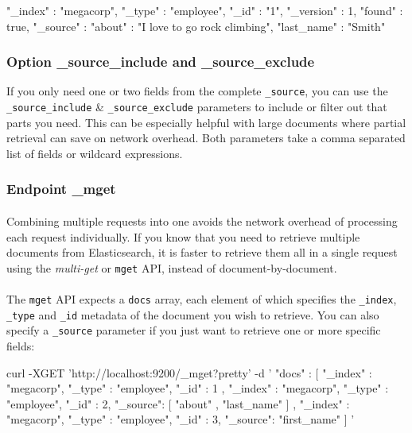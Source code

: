\documentclass{article}%
\begin{document}
\begin{command}
{
	"_index" : "megacorp",
	"_type" : "employee",
	"_id" : "1",
	"_version" : 1,
	"found" : true,
	"_source" : {
		"about" : "I love to go rock climbing",
		"last_name" : "Smith"
	}
}
\end{command}

\subsubsection{Option \_source\_include and \_source\_exclude}

If you only need one or two fields from the complete \texttt{\_source}, you can use the \texttt{\_source\_include} \& \texttt{\_source\_exclude} parameters to include or filter out that parts you need. This can be especially helpful with large documents where partial retrieval can save on network overhead. Both parameters take a comma separated list of fields or wildcard expressions.


\subsubsection{Endpoint \_mget}

\paragraph{} Combining multiple requests into one avoids the network overhead of processing each request individually. If you know that you need to retrieve multiple documents from Elasticsearch, it is faster to retrieve them all in a single request using the \textit{multi-get} or \texttt{mget} API, instead of document-by-document.

\paragraph{} The \texttt{mget} API expects a \texttt{docs} array, each element of which specifies the \texttt{\_index}, \texttt{\_type} and \texttt{\_id} metadata of the document you wish to retrieve. You can also specify a \texttt{\_source} parameter if you just want to retrieve one or more specific fields:

\begin{command}
curl -XGET 'http://localhost:9200/_mget?pretty' -d '
{
	"docs" : [
		{
			"_index" : "megacorp",
			"_type" :  "employee",
			"_id" :    1
		},
		{
			"_index" : "megacorp",
			"_type" :  "employee",
			"_id" :    2,
			"_source": [ "about" , "last_name" ]
		},
		{
			"_index" : "megacorp",
			"_type" :  "employee",
			"_id" :    3,
			"_source": "first_name"
		}
	]
}'
\end{command}
\end{document}
